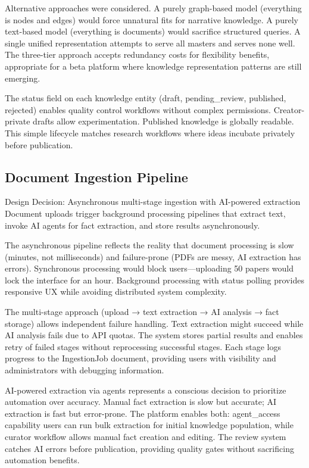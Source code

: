 \documentclass[12pt,a4paper]{article}
\begin{document}
Alternative approaches were considered. A purely graph-based model (everything is nodes and edges) would force unnatural fits for narrative knowledge. A purely text-based model (everything is documents) would sacrifice structured queries. A single unified representation attempts to serve all masters and serves none well. The three-tier approach accepts redundancy costs for flexibility benefits, appropriate for a beta platform where knowledge representation patterns are still emerging.

The status field on each knowledge entity (draft, pending\_review, published, rejected) enables quality control workflows without complex permissions. Creator-private drafts allow experimentation. Published knowledge is globally readable. This simple lifecycle matches research workflows where ideas incubate privately before publication.

\subsection{Document Ingestion Pipeline}

\begin{rationale}{Design Decision: Asynchronous multi-stage ingestion with AI-powered extraction}
Document uploads trigger background processing pipelines that extract text, invoke AI agents for fact extraction, and store results asynchronously.
\end{rationale}

The asynchronous pipeline reflects the reality that document processing is slow (minutes, not milliseconds) and failure-prone (PDFs are messy, AI extraction has errors). Synchronous processing would block users—uploading 50 papers would lock the interface for an hour. Background processing with status polling provides responsive UX while avoiding distributed system complexity.

The multi-stage approach (upload → text extraction → AI analysis → fact storage) allows independent failure handling. Text extraction might succeed while AI analysis fails due to API quotas. The system stores partial results and enables retry of failed stages without reprocessing successful stages. Each stage logs progress to the IngestionJob document, providing users with visibility and administrators with debugging information.

AI-powered extraction via agents represents a conscious decision to prioritize automation over accuracy. Manual fact extraction is slow but accurate; AI extraction is fast but error-prone. The platform enables both: agent\_access capability users can run bulk extraction for initial knowledge population, while curator workflow allows manual fact creation and editing. The review system catches AI errors before publication, providing quality gates without sacrificing automation benefits.
\end{document}
